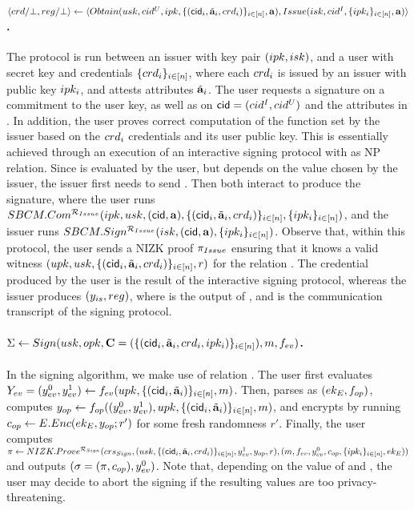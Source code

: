 \paragraph{$\langle crd/\bot,reg/\bot \rangle \gets
  \langle Obtain(usk,cid^U,ipk,\lbrace (\mathsf{cid}_i,\tilde{\mathbf{a}}_i,crd_i) \rbrace_{i\in[n]},
  \mathbf{a}),Issue(isk,cid^I,\lbrace ipk_i \rbrace_{i\in[n]},\mathbf{a})\rangle$.} %
The protocol is run between an issuer with key pair $(ipk,isk)$, and a user
with secret key \usk and credentials $\lbrace crd_i \rbrace_{i\in[n]}$, where
each $crd_i$ is issued by an issuer with public key $ipk_i$, and
attests attributes $\tilde{\mathbf{a}}_i$. The user requests a signature on a commitment to
the user key, as well as on $\mathsf{cid}=(cid^I,cid^U)$ and the attributes in \attrs.
In addition, the user proves correct computation of the \fissue function set by
the issuer based on the $crd_i$ credentials and its user public key.
This is essentially achieved through an execution of an \SBCM interactive
signing protocol with \RelIss as NP relation. Since \fissue is
evaluated by the user, but depends on the \cidi value chosen by the issuer, the
issuer first needs to send \cidi.
Then both interact to produce the \SBCM signature, where the
user runs $SBCM.Com^{\mathcal{R}_{Issue}}(ipk,usk,(\mathsf{cid},\mathbf{a}),\lbrace (\mathsf{cid}_i,
\tilde{\mathbf{a}}_i,crd_i)\rbrace_{i\in[n]},\lbrace ipk_i \rbrace_{i\in[n]})$, and the
issuer runs $SBCM.Sign^{\mathcal{R}_{Issue}}(isk,(\mathsf{cid},\mathbf{a}),\lbrace ipk_i
\rbrace_{i\in[n]})$. Observe that, within this protocol, the user sends a NIZK
proof $\pi_{Issue}$ ensuring that it knows a valid witness $(upk,usk,
\lbrace (\mathsf{cid}_i,\tilde{\mathbf{a}}_i,crd_i)\rbrace_{i \in [n]},r)$ for the relation
\RelIss. The credential \cred produced by the user is the result of
the interactive signing protocol, whereas the issuer produces $(y_{is},
reg)$, where \yissue is the output of \fissue, and \utrans is the
communication transcript of the signing protocol.%

\paragraph{$\Sigma \gets Sign(usk,opk,
  \mathbf{C}=(\lbrace (\mathsf{cid}_i,\tilde{\mathbf{a}}_i,crd_i,ipk_i)\rbrace_{i\in[n]}),
  m,f_{ev})$.} %
In the signing algorithm, we make use of relation \RelSig.
% 
The user first evaluates $Y_{ev} = (y_{ev}^0,y_{ev}^1) \gets f_{ev} (upk,
\lbrace(\mathsf{cid}_i,\tilde{\mathbf{a}}_i)\rbrace_{i\in[n]},m)$. Then, parses \opk as $(ek_{E},
f_{op})$, computes $y_{op} \gets f_{op}((y_{ev}^0,y_{ev}^1),upk,
\lbrace(\mathsf{cid}_i,\tilde{\mathbf{a}}_i)\rbrace_{i\in[n]},m)$, and encrypts
\yinsp by running $c_{op} \gets E.Enc(ek_{E},y_{op}; r')$ for some fresh
randomness $r'$. Finally, the user
computes $\pi \gets NIZK.Prove^{\mathcal{R}_{Sign}}(crs_{Sign},(usk,
\lbrace(\mathsf{cid}_i,\tilde{\mathbf{a}}_i,crd_i)\rbrace_{i\in[n]},y_{ev}^1,y_{op},r),(m,
f_{ev},y_{ev}^0,c_{op},\lbrace ipk_i\rbrace_{i\in[n]},ek_{E}))$ and outputs
$(\sigma = (\pi,c_{op}),y_{ev}^0)$. Note that, depending on the value of
\Yeval and \yinsp, the user may decide to abort
the signing if the resulting values are too privacy-threatening.

